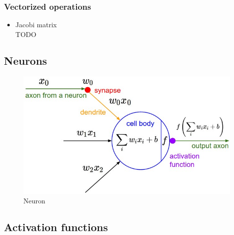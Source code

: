 \documentclass{scrartcl}
\begin{document}
\subsubsection{Vectorized operations}

\begin{itemize}
	\item Jacobi matrix \\ TODO
\end{itemize}

\subsection{Neurons}

\begin{figure}[ht!]
	\caption{Neuron}
	\centering
	\includegraphics[width=\textwidth]{figures/neuron_model.jpeg}
\end{figure}

\subsection{Activation functions}
\end{document}
